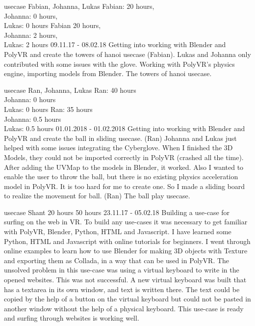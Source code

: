 	{usecase}%
	{Fabian, Johanna, Lukas}%
	{Fabian: 20 hours, \\
	 Johanna: 0 hours,\\
	 Lukas: 0 hours}%
	{Fabian 20 hours, \\
	Johanna: 2 hours,\\
	Lukas: 2 hours}%
	{09.11.17 - 08.02.18}%
	{Getting into working with Blender and PolyVR and create the towers of hanoi usecase (Fabian). Lukas and Johanna only contributed with some issues with the glove.}%
	{Working with PolyVR's physics engine, importing models from Blender.}%
	{The towers of hanoi usecase.}%
	
	{usecase}%
	{Ran, Johanna, Lukas} %
	{Ran: 40 hours \\
	 Johanna: 0 hours \\
	 Lukas: 0 hours} %
	{Ran: 35 hours \\
	 Johanna: 0.5 hours \\
	 Lukas: 0.5 hours} %
	{01.01.2018 - 01.02.2018} %
	{Getting into working with Blender and PolyVR and create the ball in sliding usecase. (Ran) Johanna and Lukas just helped with some issues integrating the Cyberglove.}%
	{When I finished the 3D Models, they could not be imported correctly in PolyVR (crashed all the time). After adding the UVMap to the models in Blender, it worked. Also I wanted to enable the user to throw the ball, but there is no existing physics acceleration model in PolyVR. It is too hard for me to create one. So I made a sliding board to realize the movement for ball. (Ran)}%
	{The ball play usecase.}%

	{usecase}%
	{Shant} %
	{20 hours} %
	{50 hours} %
	{23.11.17 - 05.02.18} %
	{Building a use-case for surfing on the web in VR.}%
	{To build any use-cases it was necessary to get familiar with PolyVR, Blender, Python, HTML and Javascript. I have learned some Python, HTML and Javascript with online tutorials for beginners. I went through online examples to learn how to use Blender for making 3D objects with Texture and exporting them as Collada, in a way that can be used in PolyVR. The unsolved problem in this use-case was using a virtual keyboard to write in the opened websites. This was not successful. A new virtual keyboard was built that has a textarea in its own window, and text is written there. The text could be copied by the help of a button on the virtual keyboard but could not be pasted in another window without the help of a physical keyboard.}%
	{This use-case is ready and surfing through websites is working well.}%
	
